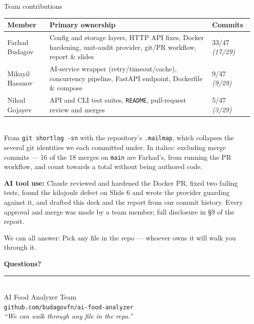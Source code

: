 \documentclass[aspectratio=169,11pt]{beamer}
\newcommand{\teamname}{AI Food Analyzer Team}
\newcommand{\memberone}{Farhad Budagov}
\newcommand{\membertwo}{Mikayil Hasanov}
\newcommand{\memberthree}{Nihad Gojayev}
\newcommand{\repolink}{github.com/budagovfn/ai-food-analyzer}
\begin{document}
\begin{frame}{Team contributions}
  \begin{center}\footnotesize
  \begin{tabularx}{\linewidth}{lXl}
    \toprule
    \textbf{Member} & \textbf{Primary ownership} & \textbf{Commits} \\
    \midrule
    \memberone   & Config and storage layers, HTTP API fixes, Docker hardening, unit-audit provider, git/PR workflow, report \& slides & 33/47 \textit{(17/29)} \\
    \membertwo   & AI-service wrapper (retry/timeout/cache), concurrency pipeline, FastAPI endpoint, Dockerfile \& compose & 9/47 \textit{(9/29)} \\
    \memberthree & API and CLI test suites, \texttt{README}, pull-request review and merges & 5/47 \textit{(3/29)} \\
    \bottomrule
  \end{tabularx}\\[0.3em]
  {\scriptsize From \texttt{git shortlog -sn} with the repository's \texttt{.mailmap}, which collapses the several git identities we each committed under. In italics: excluding merge commits --- 16 of the 18 merges on \texttt{main} are Farhad's, from running the PR workflow, and count towards a total without being authored code.}
  \end{center}

  \vspace{0.2em}
  {\small\textbf{AI tool use:} Claude reviewed and hardened the Docker PR, fixed two failing tests, found the kilojoule defect on Slide 6 and wrote the provider guarding against it, and drafted this deck and the report from our commit history. Every approval and merge was made by a team member; full disclosure in \S9 of the report.}

  \vspace{0.2em}
  \begin{block}{We can all answer:}
    \small Pick any file in the repo --- whoever owns it will walk you through it.
  \end{block}
\end{frame}

{%
\begin{frame}[plain]
  \begin{center}
    \vspace{1cm}
    {\Huge\bfseries\color{accent} Questions?}\\[1.2em]
    \rule{0.5\textwidth}{0.6pt}\\[1.2em]
    {\large \teamname}\\[0.6em]
    {\normalsize \texttt{\repolink}}\\[1cm]
    {\footnotesize\itshape ``We can walk through any file in the repo.''}
  \end{center}
\end{frame}
}
\end{document}
